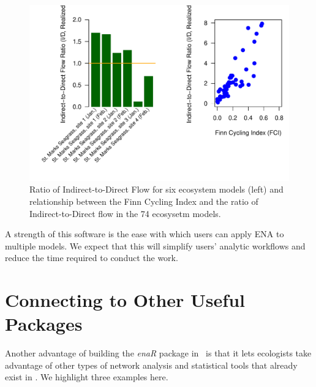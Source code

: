 \documentclass[article]{jss}
\newcommand{\R}{\proglang{R}}
\begin{document}
\begin{Schunk}
\end{Schunk}


\begin{figure}
  \center
\includegraphics{enaR-vignette-052}
\caption{Ratio of Indirect-to-Direct Flow for six ecosystem models
  (left) and relationship between the Finn Cycling Index and the ratio
  of Indirect-to-Direct flow in the 74 ecosysetm models.} \label{fig:idf}
\end{figure}

A strength of this software is the ease with which users can apply ENA
to multiple models.  We expect that this will simplify users'
analytic workflows and reduce the time required to conduct the work.


\section{Connecting to Other Useful Packages}
Another advantage of building the \textit{enaR} package in \R\ is that
it lets ecologists take advantage of other types of network analysis
and statistical tools that already exist in \R.  We highlight three
examples here.
\end{document}
